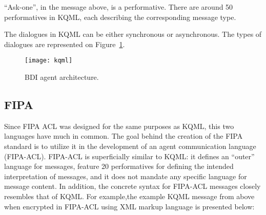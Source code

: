  ``Ask-one'', in the message above, is a performative. There are around 50 performatives in KQML, each describing the corresponding message type.\par
 The dialogues in KQML can be either synchronous or asynchronous. The types of dialogues are represented on Figure~\ref{KQMLDialog}.
    \begin{figure}[h!]
      \begin{center}
     \texttt{[image: kqml]}
      \caption{BDI agent architecture.}
      \label{KQMLDialog}
      \end{center}
    \end{figure}

\subsection{FIPA}
Since FIPA ACL was designed for the same purposes as KQML, this two languages have much in common.
The goal behind the creation of the FIPA standard is to utilize it in the development of an agent communication language (FIPA-ACL).  FIPA-ACL is superficially similar to KQML: it defines an ``outer'' language for messages, feature 20 performatives for defining the intended interpretation of messages, and it does not mandate any specific language for message content. In addition, the concrete syntax for FIPA-ACL messages closely resembles that of KQML. For example,the example KQML message from above when encrypted in FIPA-ACL using XML markup language is presented below:
\addtolength{\jot}{-10pt}
